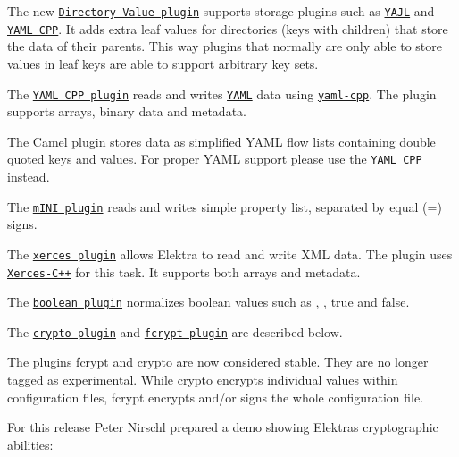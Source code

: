 \begin{DoxyItemize}
\item The new \href{https://www.libelektra.org/plugins/directoryvalue}{\tt Directory Value plugin} supports storage plugins such as \href{https://www.libelektra.org/plugins/yajl}{\tt Y\+A\+JL} and \href{https://www.libelektra.org/plugins/yamlcpp}{\tt Y\+A\+ML C\+PP}. It adds extra leaf values for directories (keys with children) that store the data of their parents. This way plugins that normally are only able to store values in leaf keys are able to support arbitrary key sets.
\item The \href{https://www.libelektra.org/plugins/yamlcpp}{\tt Y\+A\+ML C\+PP plugin} reads and writes \href{http://yaml.org}{\tt Y\+A\+ML} data using \href{https://github.com/jbeder/yaml-cpp}{\tt yaml-\/cpp}. The plugin supports arrays, binary data and metadata.
\item The Camel plugin stores data as simplified Y\+A\+ML flow lists containing double quoted keys and values. For proper Y\+A\+ML support please use the \href{https://www.libelektra.org/plugins/yamlcpp}{\tt Y\+A\+ML C\+PP} instead.
\item The \href{https://www.libelektra.org/plugins/mini}{\tt m\+I\+NI plugin} reads and writes simple property list, separated by equal ({\ttfamily =}) signs.
\item The \href{https://www.libelektra.org/plugins/xerces}{\tt xerces plugin} allows Elektra to read and write X\+ML data. The plugin uses \href{http://xerces.apache.org/xerces-c}{\tt Xerces-\/\+C++} for this task. It supports both arrays and metadata.
\item The \href{https://www.libelektra.org/plugins/boolean}{\tt boolean plugin} normalizes boolean values such as {}, {}, {\ttfamily true} and {\ttfamily false}.
\item The \href{https://www.libelektra.org/plugins/crypto}{\tt crypto plugin} and \href{https://www.libelektra.org/plugins/fcrypt}{\tt fcrypt plugin} are described below.
\end{DoxyItemize}

The plugins {\ttfamily fcrypt} and {\ttfamily crypto} are now considered stable. They are no longer tagged as {\ttfamily experimental}. While {\ttfamily crypto} encrypts individual values within configuration files, {\ttfamily fcrypt} encrypts and/or signs the whole configuration file.

For this release Peter Nirschl prepared a demo showing Elektra\textquotesingle{}s cryptographic abilities\+:

